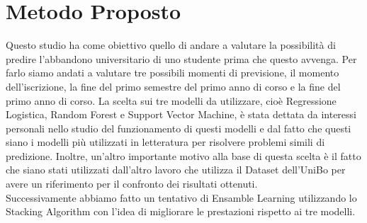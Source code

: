 \documentclass[../Report.tex]{subfiles}
\begin{document}
    \chapter{Metodo Proposto}
    Questo studio ha come obiettivo quello di andare a valutare la possibilità di predire l'abbandono universitario di uno studente prima che questo avvenga. Per farlo siamo andati a valutare tre possibili momenti di previsione, il momento dell'iscrizione, la fine del primo semestre del primo anno di corso e la fine del primo anno di corso. La scelta sui tre modelli da utilizzare, cioè Regressione Logistica, Random Forest e Support Vector Machine, è stata dettata da interessi personali nello studio del funzionamento di questi modelli e dal fatto che questi siano i modelli più utilizzati in letteratura per risolvere problemi simili di predizione. Inoltre, un'altro importante motivo alla base di questa scelta è il fatto che siano stati utilizzati dall'altro lavoro che utilizza il Dataset dell'UniBo \cite{DelBonifro} per avere un riferimento per il confronto dei risultati ottenuti.\\
    Successivamente abbiamo fatto un tentativo di Ensamble Learning utilizzando lo Stacking Algorithm con l'idea di migliorare le prestazioni rispetto ai tre modelli.
    
    
    
    
    
    
\end{document}
